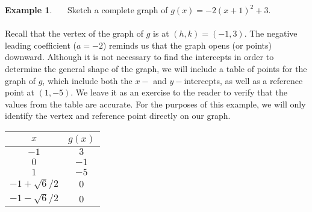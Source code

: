 \documentclass[11pt]{book}
\theoremstyle{definition}  %
\newtheorem{example}{Example}[chapter]
\begin{document}
\begin{example}~~~Sketch a complete graph of $g(x)=-2(x+1)^2+3$.\\
~\\
Recall that the vertex of the graph of $g$ is at $(h,k)=(-1,3)$.  The negative leading coefficient ($a=-2$) reminds us that the graph opens (or points) downward.  Although it is not necessary to find the intercepts in order to determine the general shape of the graph, we will include a table of points for the graph of $g$, which include both the $x-$ and $y-$intercepts, as well as a reference point at $(1,-5)$.  We leave it as an exercise to the reader to verify that the values from the table are accurate.  For the purposes of this example, we will only identify the vertex and reference point directly on our graph.

\newpage

\begin{multicols}{2}
\begin{center}
\begin{tabular}{c|c}
	$x$ & $g(x)$\\
	\hline
	$-1$ & $3$\\
	\hline
	$0$ & $-1$\\
	\hline
	$1$ & $-5$\\
	\hline
	$-1+\sqrt{6}/2$ & $0$\\
	\hline
	$-1-\sqrt{6}/2$ & $0$
\end{tabular}
\end{center}


\end{multicols}
\end{example}
\end{document}
